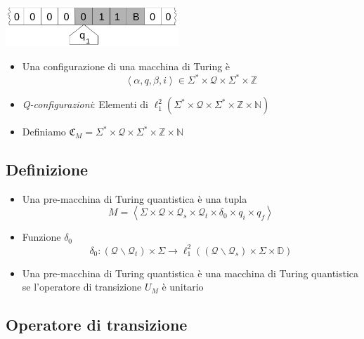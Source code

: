 \documentclass{beamer}
\begin{document}
\begin{frame}{\subsecname}{}
	\centering\includegraphics[width=6.5cm]{Turing_machine_2b.png}
	\begin{itemize}
		\item Una configurazione di una macchina di Turing è
		\[ \left \langle \alpha, q, \beta, i \right \rangle \in \Sigma^{*} \times \mathcal{Q} \times \Sigma^{*} \times \mathbb{Z} \]
		\item \textit{Q-configurazioni}: Elementi di \( \ell^{2}_{1} \left ( \Sigma^{*} \times \mathcal{Q} \times \Sigma^{*} \times \mathbb{Z} \times \mathbb{N} \right ) \)
		\item Definiamo \( \mathfrak{C}_M = \Sigma^{*} \times \mathcal{Q} \times \Sigma^{*} \times \mathbb{Z} \times \mathbb{N} \)
	\end{itemize}
\end{frame}

\subsection{Definizione}

\begin{frame}{\subsecname}{}
	\begin{itemize}
		\item Una pre-macchina di Turing quantistica è una tupla
		\[ M = \left \langle \Sigma \times \mathcal{Q} \times \mathcal{Q}_{s} \times \mathcal{Q}_{t} \times \delta_{0} \times q_{i} \times q_{f} \right \rangle \]
		\item Funzione \(\delta_{0}\)
		\[ \delta_{0} : \left ( \mathcal{Q} \backslash \mathcal{Q}_{t} \right ) \times \Sigma \rightarrow \ell^{2}_{1} \left ( \left ( \mathcal{Q} \backslash \mathcal{Q}_{s} \right ) \times \Sigma \times \mathbb{D} \right ) \]
		\item Una pre-macchina di Turing quantistica è una macchina di Turing quantistica se l'operatore di transizione \( U_{M} \) è unitario
	\end{itemize}
\end{frame}

\subsection{Operatore di transizione}
\end{document}
